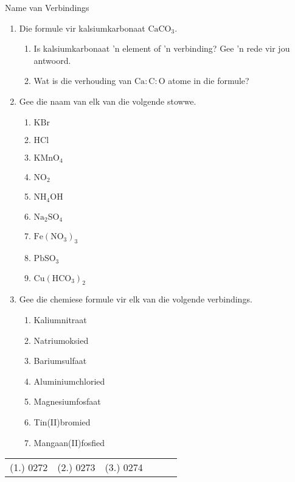   \label{m38708*secfhsst!!!underscore!!!id255}
            \begin{exercises}{Name van Verbindings}
{            \nopagebreak \noindent
      \label{m38708*id65118}\begin{enumerate}[noitemsep, label=\textbf{\arabic*}. ] 
            \label{m38708*uid47}\item Die formule vir kalsiumkarbonaat $\text{CaCO}{}_{3}$.
\label{m38708*id65148}\begin{enumerate}[noitemsep, label=\textbf{\alph*}. ] 
            \label{m38708*uid48}\item Is kalsiumkarbonaat 'n element of 'n verbinding? Gee 'n rede vir jou antwoord.
\label{m38708*uid49}\item Wat is die verhouding van $\text{Ca}:\text{C}:\text{O}$ atome in die formule?
\end{enumerate}
\label{m38708*uid50}\item Gee die naam van elk van die volgende stowwe.
\label{m38708*id65189}\begin{enumerate}[noitemsep, label=\textbf{\alph*}. ] 
            \label{m38708*uid51}\item $\text{KBr}$
\label{m38708*uid52}\item $\text{HCl}$
\label{m38708*uid53}\item ${\text{KMnO}}_{4}$\label{m38708*uid54}\item ${\text{NO}}_{2}$\label{m38708*uid55}\item ${\text{NH}}_{4}\text{OH}$
\label{m38708*uid56}\item ${\text{Na}}_{2}{\text{SO}}_{4}$
\item ${\text{Fe}}({\text{NO}}_{3})_3$
\item ${\text{Pb}}{\text{SO}}_{3}$
\item ${\text{Cu}}({\text{HCO}}_{3})_2$
\end{enumerate}
\label{m38708*uid57}\item Gee die chemiese formule vir elk van die volgende verbindings.
\label{m38708*id65338}\begin{enumerate}[noitemsep, label=\textbf{\alph*}. ] 
            \label{m38708*uid58}\item Kaliumnitraat
\label{m38708*uid59}\item Natriumoksied
\label{m38708*uid60}\item Bariumsulfaat
\label{m38708*uid61}\item Aluminiumchloried
\label{m38708*uid62}\item Magnesiumfosfaat
\item Tin(II)bromied
\item Mangaan(II)fosfied
\end{enumerate}
\end{enumerate}

\practiceinfo
\begin{tabular}[h]{cccccc}
 (1.) 0272  &  (2.) 0273  &  (3.) 0274   & & 
\end{tabular}
}
\end{exercises}
